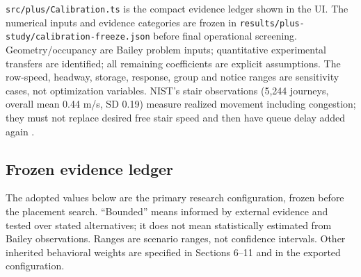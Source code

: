 \documentclass[11pt,a4paper]{article}
\newcommand{\code}[1]{{\small\nolinkurl{#1}}}
\begin{document}
\code{src/plus/Calibration.ts} is the compact evidence ledger shown in the UI. The numerical inputs and evidence categories are frozen in \code{results/plus-study/calibration-freeze.json} before final operational screening. Geometry/occupancy are Bailey problem inputs; quantitative experimental transfers are identified; all remaining coefficients are explicit assumptions. The row-speed, headway, storage, response, group and notice ranges are sensitivity cases, not optimization variables. NIST's stair observations (5,244 journeys, overall mean 0.44 m/s, SD 0.19) measure realized movement including congestion; they must not replace desired free stair speed and then have queue delay added again \cite{R25}.


\subsection{Frozen evidence ledger}

The adopted values below are the primary research configuration, frozen before the placement search. “Bounded” means informed by external evidence and tested over stated alternatives; it does not mean statistically estimated from Bailey observations. Ranges are scenario ranges, not confidence intervals. Other inherited behavioral weights are specified in Sections 6–11 and in the exported configuration.
\end{document}
